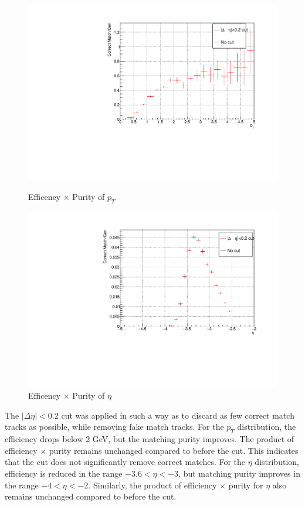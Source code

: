 \begin{figure}[htbp]
                \vspace{1em}
                \begin{minipage}{0.45\textwidth}
                        \centering
                        \includegraphics[width=\textwidth]{fig/3_5_6_effpuri_pt.pdf}
                    \caption{Efficency $\times$ Purity of $p_T$}
                \end{minipage}
                \hfill
                \begin{minipage}{0.45\textwidth}
                    \centering
                    \includegraphics[width=\textwidth]{fig/3_5_6_effpuri_eta.pdf}
                    \caption{Efficency $\times$ Purity of $\eta$}
                \end{minipage}
            \end{figure}
            The \( |\Delta \eta| < 0.2 \) cut was applied in such a way as to discard as few correct match tracks as possible, while removing fake match tracks. For the \( p_T \) distribution, the efficiency drops below 2 GeV, but the matching purity improves. The product of efficiency \(\times\) purity remains unchanged compared to before the cut. This indicates that the cut does not significantly remove correct matches. For the \(\eta\) distribution, efficiency is reduced in the range \( -3.6 < \eta < -3 \), but matching purity improves in the range \( -4 < \eta < -2 \). Similarly, the product of efficiency \(\times\) purity for \(\eta\) also remains unchanged compared to before the cut.